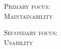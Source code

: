 \begin{titlepage}
\begin{center}
\begin{minipage}{0.4\textwidth}
\begin{flushleft} \large

\textsc{Primary focus:}\\
\textsc{Maintainability}\\

\end{flushleft}
\end{minipage}
\begin{minipage}{0.4\textwidth}
\begin{flushright} \large

\textsc{Secondary focus:}\\
\textsc{Usability}

\end{flushright}
\end{minipage}

\vfill

\end{center}

\end{titlepage}
